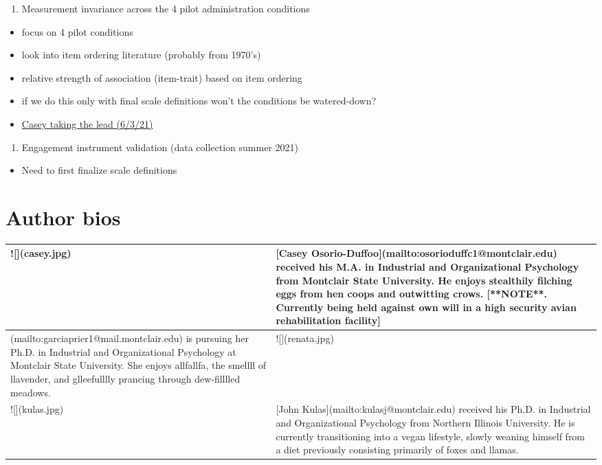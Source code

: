 \documentclass[
]{book}
\providecommand{\tightlist}{%
  \setlength{\itemsep}{0pt}\setlength{\parskip}{0pt}}
\begin{document}
\begin{enumerate}
\def\labelenumi{\arabic{enumi}.}
\setcounter{enumi}{1}
\tightlist
\item
  Measurement invariance across the 4 pilot administration conditions
\end{enumerate}

\begin{itemize}
\tightlist
\item
  focus on 4 pilot conditions
\item
  look into item ordering literature (probably from 1970's)
\item
  relative strength of association (item-trait) based on item ordering
\item
  if we do this only with final scale definitions won't the conditions be watered-down?
\item
  \href{https://github.com/casosorio/SIOP-Engagement-Measurment-Invariance}{Casey taking the lead (6/3/21)}
\end{itemize}

\begin{enumerate}
\def\labelenumi{\arabic{enumi}.}
\setcounter{enumi}{2}
\tightlist
\item
  Engagement instrument validation (data collection summer 2021)
\end{enumerate}

\begin{itemize}
\tightlist
\item
  Need to first finalize scale definitions
\end{itemize}

\hypertarget{author-bios}{%
\chapter{Author bios}\label{author-bios}}

\begin{tabular}{l|l}
\hline
![](casey.jpg) & [Casey Osorio-Duffoo](mailto:osorioduffc1@montclair.edu) received his M.A. in Industrial and Organizational Psychology from Montclair State University. He enjoys stealthily filching eggs from hen coops and  outwitting crows. [**NOTE**. Currently being held against own will in a high security avian rehabilitation facility]\\
\hline
[Renata Garcia Prieto Palacios Roji](mailto:garciaprier1@mail.montclair.edu) is pursuing her Ph.D. in Industrial and Organizational Psychology at Montclair State University. She enjoys allfallfa, the smellll of llavender,  and glleefulllly prancing through dew-filllled meadows. & ![](renata.jpg)\\
\hline
![](kulas.jpg) & [John Kulas](mailto:kulasj@montclair.edu) received his Ph.D. in Industrial and Organizational Psychology from Northern Illinois University. He is currently transitioning into a vegan lifestyle, slowly weaning himself from a diet previously consisting primarily of foxes and llamas.\\
\hline
\end{tabular}
\end{document}
